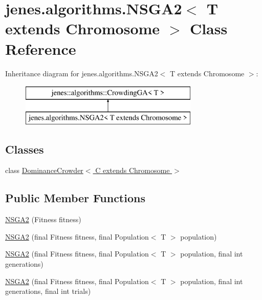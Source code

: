 \hypertarget{classjenes_1_1algorithms_1_1_n_s_g_a2_3_01_t_01extends_01_chromosome_01_4}{\section{jenes.\-algorithms.\-N\-S\-G\-A2$<$ T extends Chromosome $>$ Class Reference}
\label{classjenes_1_1algorithms_1_1_n_s_g_a2_3_01_t_01extends_01_chromosome_01_4}
}
Inheritance diagram for jenes.\-algorithms.\-N\-S\-G\-A2$<$ T extends Chromosome $>$\-:\begin{figure}[H]
\begin{center}
\leavevmode
\includegraphics[height=2.000000cm]{classjenes_1_1algorithms_1_1_n_s_g_a2_3_01_t_01extends_01_chromosome_01_4}
\end{center}
\end{figure}
\subsection*{Classes}
\begin{DoxyCompactItemize}
\item 
class \hyperlink{classjenes_1_1algorithms_1_1_n_s_g_a2_3_01_t_01extends_01_chromosome_01_4_1_1_dominance_crowder_a9a2fee645e4624e57f18141d651cc84}{Dominance\-Crowder$<$ C extends Chromosome $>$}
\end{DoxyCompactItemize}
\subsection*{Public Member Functions}
\begin{DoxyCompactItemize}
\item 
\hyperlink{classjenes_1_1algorithms_1_1_n_s_g_a2_3_01_t_01extends_01_chromosome_01_4_a0e9264bdd3c0f0f73fecdc89038b2898}{N\-S\-G\-A2} (Fitness fitness)
\item 
\hyperlink{classjenes_1_1algorithms_1_1_n_s_g_a2_3_01_t_01extends_01_chromosome_01_4_a49f57f66489874c5bf12b3f9c89e6fcc}{N\-S\-G\-A2} (final Fitness fitness, final Population$<$ T $>$ population)
\item 
\hyperlink{classjenes_1_1algorithms_1_1_n_s_g_a2_3_01_t_01extends_01_chromosome_01_4_a4da7d36c029be00959ea063643833486}{N\-S\-G\-A2} (final Fitness fitness, final Population$<$ T $>$ population, final int generations)
\item 
\hyperlink{classjenes_1_1algorithms_1_1_n_s_g_a2_3_01_t_01extends_01_chromosome_01_4_ac0873ceec23f2908e64650b2e0f2b62a}{N\-S\-G\-A2} (final Fitness fitness, final Population$<$ T $>$ population, final int generations, final int trials)
\end{DoxyCompactItemize}
